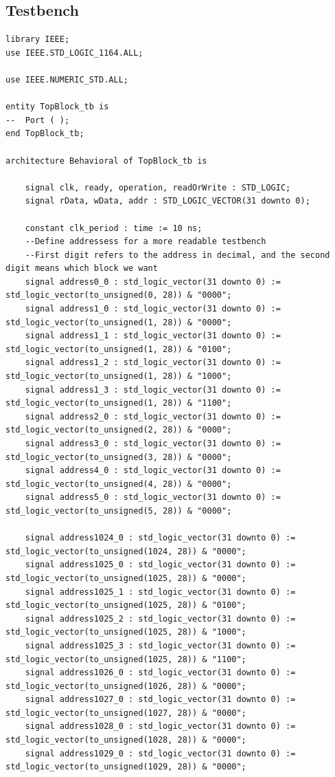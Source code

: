 \documentclass{article}
\begin{document}
\subsection{Testbench}
\begin{lstlisting}
library IEEE;
use IEEE.STD_LOGIC_1164.ALL;

use IEEE.NUMERIC_STD.ALL;

entity TopBlock_tb is
--  Port ( );
end TopBlock_tb;

architecture Behavioral of TopBlock_tb is

    signal clk, ready, operation, readOrWrite : STD_LOGIC;
    signal rData, wData, addr : STD_LOGIC_VECTOR(31 downto 0);

    constant clk_period : time := 10 ns;
    --Define addressess for a more readable testbench
    --First digit refers to the address in decimal, and the second digit means which block we want
    signal address0_0 : std_logic_vector(31 downto 0) := std_logic_vector(to_unsigned(0, 28)) & "0000";
    signal address1_0 : std_logic_vector(31 downto 0) := std_logic_vector(to_unsigned(1, 28)) & "0000";
    signal address1_1 : std_logic_vector(31 downto 0) := std_logic_vector(to_unsigned(1, 28)) & "0100";
    signal address1_2 : std_logic_vector(31 downto 0) := std_logic_vector(to_unsigned(1, 28)) & "1000";
    signal address1_3 : std_logic_vector(31 downto 0) := std_logic_vector(to_unsigned(1, 28)) & "1100";
    signal address2_0 : std_logic_vector(31 downto 0) := std_logic_vector(to_unsigned(2, 28)) & "0000";
    signal address3_0 : std_logic_vector(31 downto 0) := std_logic_vector(to_unsigned(3, 28)) & "0000";
    signal address4_0 : std_logic_vector(31 downto 0) := std_logic_vector(to_unsigned(4, 28)) & "0000";
    signal address5_0 : std_logic_vector(31 downto 0) := std_logic_vector(to_unsigned(5, 28)) & "0000";

    signal address1024_0 : std_logic_vector(31 downto 0) := std_logic_vector(to_unsigned(1024, 28)) & "0000";
    signal address1025_0 : std_logic_vector(31 downto 0) := std_logic_vector(to_unsigned(1025, 28)) & "0000";
    signal address1025_1 : std_logic_vector(31 downto 0) := std_logic_vector(to_unsigned(1025, 28)) & "0100";
    signal address1025_2 : std_logic_vector(31 downto 0) := std_logic_vector(to_unsigned(1025, 28)) & "1000";
    signal address1025_3 : std_logic_vector(31 downto 0) := std_logic_vector(to_unsigned(1025, 28)) & "1100";
    signal address1026_0 : std_logic_vector(31 downto 0) := std_logic_vector(to_unsigned(1026, 28)) & "0000";
    signal address1027_0 : std_logic_vector(31 downto 0) := std_logic_vector(to_unsigned(1027, 28)) & "0000";
    signal address1028_0 : std_logic_vector(31 downto 0) := std_logic_vector(to_unsigned(1028, 28)) & "0000";
    signal address1029_0 : std_logic_vector(31 downto 0) := std_logic_vector(to_unsigned(1029, 28)) & "0000";


\end{lstlisting}
\end{document}
